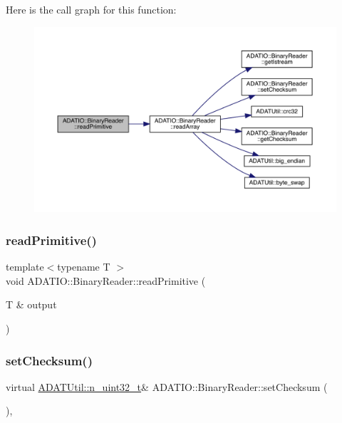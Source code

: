 Here is the call graph for this function\+:
\nopagebreak
\begin{figure}[H]
\begin{center}
\leavevmode
\includegraphics[width=350pt]{da/dd9/classADATIO_1_1BinaryReader_aeb7e739afca615aff19646e64b8da320_cgraph}
\end{center}
\end{figure}
\mbox{\label{classADATIO_1_1BinaryReader_aeb7e739afca615aff19646e64b8da320}} 
\subsubsection{\texorpdfstring{readPrimitive()}{readPrimitive()}\hspace{0.1cm}{\footnotesize\ttfamily [3/3]}}
{\footnotesize\ttfamily template$<$typename T $>$ \\
void A\+D\+A\+T\+I\+O\+::\+Binary\+Reader\+::read\+Primitive (\begin{DoxyParamCaption}\item[{T \&}]{output }\end{DoxyParamCaption})\hspace{0.3cm}{\ttfamily [protected]}}

\mbox{\label{classADATIO_1_1BinaryReader_a33d291f073bf2e1f71f6bdbe40ce343a}} 
\subsubsection{\texorpdfstring{setChecksum()}{setChecksum()}\hspace{0.1cm}{\footnotesize\ttfamily [1/3]}}
{\footnotesize\ttfamily virtual \mbox{\hyperlink{namespaceADATUtil_ad945a8afa4db2d1f89b731964adae97e}{A\+D\+A\+T\+Util\+::n\+\_\+uint32\+\_\+t}}\& A\+D\+A\+T\+I\+O\+::\+Binary\+Reader\+::set\+Checksum (\begin{DoxyParamCaption}{ }\end{DoxyParamCaption})\hspace{0.3cm}{\ttfamily [protected]}, {}}



